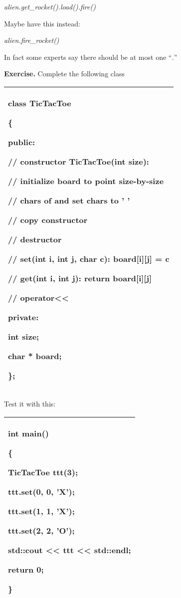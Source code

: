 \documentclass[
]{article}
\begin{document}
\emph{alien.get\_rocket().load().fire() }

Maybe have this instead:

\emph{alien.fire\_rocket() }

In fact some experts say there should be at most one ``\emph{.}''

\textbf{Exercise.} Complete the following class

\begin{longtable}[]{@{}l@{}}
\toprule
\endhead
\begin{minipage}[t]{0.97\columnwidth}\raggedright
class TicTacToe

\{

public:

// constructor TicTacToe(int size):

// initialize board to point size-by-size

// chars of and set chars to ' '

// copy constructor

// destructor

// set(int i, int j, char c): board{[}i{]}{[}j{]} = c

// get(int i, int j): return board{[}i{]}{[}j{]}

// operator\textless\textless{}

private:

int size;

char * board;

\};\strut
\end{minipage}\tabularnewline
\bottomrule
\end{longtable}

Test it with this:

\begin{longtable}[]{@{}l@{}}
\toprule
\endhead
\begin{minipage}[t]{0.97\columnwidth}\raggedright
int main()

\{

TicTacToe ttt(3);

ttt.set(0, 0, 'X');

ttt.set(1, 1, 'X');

ttt.set(2, 2, 'O');

std::cout \textless\textless{} ttt \textless\textless{} std::endl;

return 0;

\}\strut
\end{minipage}\tabularnewline
\bottomrule
\end{longtable}
\end{document}
